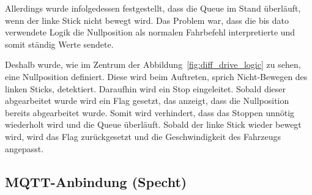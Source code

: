 Allerdings wurde infolgedessen festgestellt, dass die Queue im Stand überläuft, wenn der linke Stick nicht bewegt wird. Das Problem war, dass die bis dato verwendete Logik die Nullposition als normalen Fahrbefehl interpretierte und somit ständig Werte sendete. \newline

Deshalb wurde, wie im Zentrum der Abbildung~\ref{fig:diff_drive_logic} zu sehen, eine Nullposition definiert. Diese wird beim Auftreten, sprich Nicht-Bewegen des linken Sticks, detektiert. Daraufhin wird ein Stop eingeleitet. Sobald dieser abgearbeitet wurde wird ein Flag gesetzt, das anzeigt, dass die Nullposition bereits abgearbeitet wurde. Somit wird verhindert, dass das Stoppen unnötig wiederholt wird und die Queue überläuft. Sobald der linke Stick wieder bewegt wird, wird das Flag zurückgesetzt und die Geschwindigkeit des Fahrzeugs angepasst. \newline

\subsection{MQTT-Anbindung (Specht)}